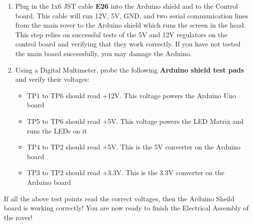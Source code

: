 \documentclass[12pt]{article}
\begin{document}
\begin{enumerate}

	\item Plug in the 1x6 JST cable \textbf{E26} into the Arduino shield and to the Control board. This cable will run 12V, 5V, GND, and two serial communication lines from the main rover to the Arduino shield which runs the screen in the head. This step relies on successful tests of the 5V and 12V regulators on the control board and verifying that they work correctly.  If you have not tested the main board successfully, you may damage the Arduino.

	\item Using a Digital Multimeter, probe the following \textbf{Arduino shield test pads} and verify their voltages:
		\begin{itemize}
			\item TP1 to TP6 should read +12V. This voltage powers the Arduino Uno board
			\item TP5 to TP6 should read +5V. This voltage powers the LED Matrix and runs the LEDs on it
			\item TP4 to TP2 should read +5V. This is the 5V converter on the Arduino board
			\item TP3 to TP2 should read +3.3V. This is the 3.3V converter on the Arduino board
				
		\end{itemize}

\end{enumerate}

If all the above test points read the correct voltages, then the Arduino Sheild board is working correctly!  You are now ready to finish the Electrical Assembly of the rover!
\end{document}
